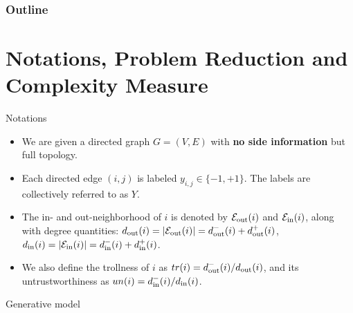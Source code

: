 \documentclass[10pt,svgnames,ignorenonframetext,final]{beamer}
\providecommand{\largelist}{%
  \setlength{\itemsep}{8pt}\setlength{\parskip}{3pt}}
\begin{document}

  \begin{frame}
    \frametitle{Outline}
    \tableofcontents%
  \end{frame}

\section{Notations, Problem Reduction and Complexity Measure}\label{setting-and-model}

\begin{frame}{Notations}

\begin{itemize}
  \largelist
\item
  We are given a directed graph \(G=(V, E)\) with \textbf{no side information} but full topology.
\item
  Each directed edge \((i,j)\) is labeled
  \(y_{i,j} \in \{-1, +1\}\). The labels are collectively
  referred to as \(Y\).
\item
  The in- and out-neighborhood of $i$ is denoted by $\mathcal{E}_{\mathrm{out}}(i)$ and $\mathcal{E}_{\mathrm{in}}(i)$, along with degree
  quantities:
  $d_{\mathrm{out}}(i)=|\mathcal{E}_{\mathrm{out}}(i)|=d_{\mathrm{out}}^-(i)+d_{\mathrm{out}}^+(i)$,\\
  $d_{\mathrm{in}}(i)=|\mathcal{E}_{\mathrm{in}}(i)|=d_{\mathrm{in}}^-(i)+d_{\mathrm{in}}^+(i)$.
\item We also define the \alert{trollness} of $i$ as \(tr(i) = d_{\mathrm{out}}^-(i)/d_{\mathrm{out}}(i)\), and its
  \alert{untrustworthiness} as \(un(i) = d_{\mathrm{in}}^-(i)/d_{\mathrm{in}}(i)\).
\end{itemize}

\end{frame}

\begin{frame}{Generative model}
  \begin{center}
\end{center}


  \end{frame}
\end{document}
